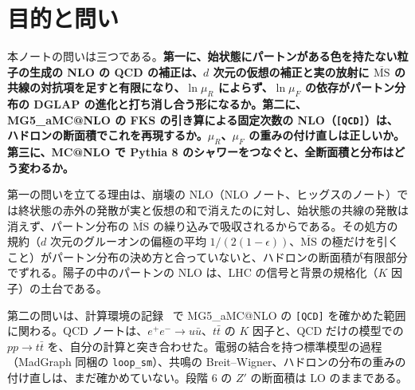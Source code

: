 \documentclass[a4paper,10pt]{ltjsarticle}
\makeatletter
\newcommand{\MSbar}{\overline{\mathrm{MS}}}
\newcommand{\MGaMC}{MG5\_aMC@NLO}
\makeatother
\begin{document}
\begin{abstract}
の重みの付け直しで、統計の範囲で一致した。手順 (3) では、$Z$ と $H$ を MC@NLO で作り、Pythia 8 でシャワーをかけた（パートンの段階）。全断面積は自分の NLO と統計の範囲で一致し（$-0.06\sigma$、$-0.45\sigma$）、ボソンのラピディティは NLO と数 \% で合った。大きい $p_T$ では、自分で4次元の実の放射から求めた LO の V$+$ジェットに近づき（150〜250~GeV で比 1.00、1.035）、小さい $p_T$ では固定次数の発散が有限な分布になった。その途中で、スケールの重みを切ると \MGaMC{} 3.8.1 のシャワーの段がメモリを使い尽くすことなど、ツールの問題を三つ見つけた。手順 (4) では、計算環境の記録の段階 6 の SSM の $Z'$ を NLO にした。手順 (1) の係数関数に $Z'$ の Born を入れるだけで $K$（ピークの付近で 1.18〜1.41）が求まり、QCD と $Z'$ だけの自作の NLO の UFO の MadLoop（$10^{-15}$）と aMC@NLO（統計の範囲）がこれを確かめた。段階 6 の事象を $K(m_{\ell\ell})$ で重み付けし直すと、SSM の質量の下限は LO の 5.04~TeV から 5.20~TeV（期待 5.16~TeV）に上がった（ATLAS は NNLO で 5.1~TeV、参照）。
\end{abstract}

\tableofcontents

\section{目的と問い}\label{sec:intro}

本ノートの問いは三つである。\textbf{第一に、始状態にパートンがある色を持たない粒子の生成の NLO の QCD の補正は、$d$ 次元の仮想の補正と実の放射に $\MSbar$ の共線の対抗項を足すと有限になり、$\ln\mu_R$ によらず、$\ln\mu_F$ の依存がパートン分布の DGLAP の進化と打ち消し合う形になるか。第二に、\MGaMC{} の FKS の引き算による固定次数の NLO（\texttt{[QCD]}）は、ハドロンの断面積でこれを再現するか。$\mu_R$、$\mu_F$ の重みの付け直しは正しいか。第三に、MC@NLO で Pythia 8 のシャワーをつなぐと、全断面積と分布はどう変わるか。}

第一の問いを立てる理由は、崩壊の NLO（NLO ノート、ヒッグスのノート）では終状態の赤外の発散が実と仮想の和で消えたのに対し、始状態の共線の発散は消えず、パートン分布の $\MSbar$ の繰り込みで吸収されるからである。その処方の規約（$d$ 次元のグルーオンの偏極の平均 $1/(2(1-\epsilon))$、$\overline{\mathrm{MS}}$ の極だけを引くこと）がパートン分布の決め方と合っていないと、ハドロンの断面積が有限部分でずれる。陽子の中のパートンの NLO は、LHC の信号と背景の規格化（$K$ 因子）の土台である。

第二の問いは、計算環境の記録~\cite{env} で \MGaMC{} の \texttt{[QCD]} を確かめた範囲に関わる。QCD ノートは、$e^+e^-\to u\bar u$、$t\bar t$ の $K$ 因子と、QCD だけの模型での $pp\to t\bar t$ を、自分の計算と突き合わせた。電弱の結合を持つ標準模型の過程（MadGraph 同梱の \texttt{loop\_sm}）、共鳴の Breit--Wigner、ハドロンの分布の重みの付け直しは、まだ確かめていない。段階 6 の $Z'$ の断面積は LO のままである。
\end{document}
